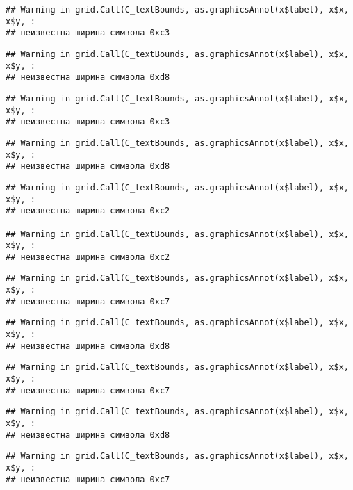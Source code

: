 \documentclass[
]{article}
\begin{document}
\begin{verbatim}
## Warning in grid.Call(C_textBounds, as.graphicsAnnot(x$label), x$x, x$y, :
## неизвестна ширина символа 0xc3
\end{verbatim}

\begin{verbatim}
## Warning in grid.Call(C_textBounds, as.graphicsAnnot(x$label), x$x, x$y, :
## неизвестна ширина символа 0xd8
\end{verbatim}

\begin{verbatim}
## Warning in grid.Call(C_textBounds, as.graphicsAnnot(x$label), x$x, x$y, :
## неизвестна ширина символа 0xc3
\end{verbatim}

\begin{verbatim}
## Warning in grid.Call(C_textBounds, as.graphicsAnnot(x$label), x$x, x$y, :
## неизвестна ширина символа 0xd8
\end{verbatim}

\begin{verbatim}
## Warning in grid.Call(C_textBounds, as.graphicsAnnot(x$label), x$x, x$y, :
## неизвестна ширина символа 0xc2

## Warning in grid.Call(C_textBounds, as.graphicsAnnot(x$label), x$x, x$y, :
## неизвестна ширина символа 0xc2
\end{verbatim}

\begin{verbatim}
## Warning in grid.Call(C_textBounds, as.graphicsAnnot(x$label), x$x, x$y, :
## неизвестна ширина символа 0xc7
\end{verbatim}

\begin{verbatim}
## Warning in grid.Call(C_textBounds, as.graphicsAnnot(x$label), x$x, x$y, :
## неизвестна ширина символа 0xd8
\end{verbatim}

\begin{verbatim}
## Warning in grid.Call(C_textBounds, as.graphicsAnnot(x$label), x$x, x$y, :
## неизвестна ширина символа 0xc7
\end{verbatim}

\begin{verbatim}
## Warning in grid.Call(C_textBounds, as.graphicsAnnot(x$label), x$x, x$y, :
## неизвестна ширина символа 0xd8
\end{verbatim}

\begin{verbatim}
## Warning in grid.Call(C_textBounds, as.graphicsAnnot(x$label), x$x, x$y, :
## неизвестна ширина символа 0xc7
\end{verbatim}
\end{document}
